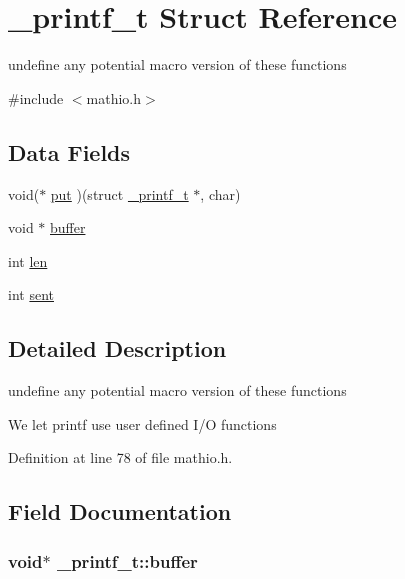 \hypertarget{struct__printf__t}{}\section{\+\_\+printf\+\_\+t Struct Reference}
\label{struct__printf__t}


undefine any potential macro version of these functions  




{\ttfamily \#include $<$mathio.\+h$>$}

\subsection*{Data Fields}
\begin{DoxyCompactItemize}
\item 
void($\ast$ \hyperlink{struct__printf__t_a3ef8eb0143b93d4446b04c6ce9313be7}{put} )(struct \hyperlink{struct__printf__t}{\+\_\+printf\+\_\+t} $\ast$, char)
\item 
void $\ast$ \hyperlink{struct__printf__t_ad35884151d0be6667caafad8caacc76f}{buffer}
\item 
int \hyperlink{struct__printf__t_a5139902cde74159b79e6418a34712bee}{len}
\item 
int \hyperlink{struct__printf__t_a872716fd701166cd57bd3fffb7b77706}{sent}
\end{DoxyCompactItemize}


\subsection{Detailed Description}
undefine any potential macro version of these functions 

We let printf use user defined I/O functions 

Definition at line 78 of file mathio.\+h.



\subsection{Field Documentation}
\subsubsection[{\texorpdfstring{buffer}{buffer}}]{\setlength{\rightskip}{0pt plus 5cm}void$\ast$ \+\_\+printf\+\_\+t\+::buffer}\hypertarget{struct__printf__t_ad35884151d0be6667caafad8caacc76f}{}\label{struct__printf__t_ad35884151d0be6667caafad8caacc76f}


